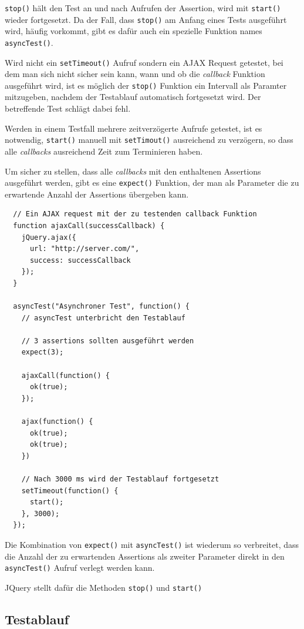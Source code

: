 \documentclass[11pt, a4paper]{article}
\begin{document}
\texttt{stop()} hält den Test an und nach Aufrufen der Assertion, wird
mit \texttt{start()} wieder fortgesetzt. Da der Fall, dass \texttt{stop()} am
Anfang eines Tests ausgeführt wird, häufig vorkommt, gibt es dafür auch ein
spezielle Funktion names \texttt{asyncTest()}.

Wird nicht ein \texttt{setTimeout()} Aufruf sondern ein AJAX Request
getestet, bei dem man sich nicht sicher sein kann, wann und ob die
\emph{callback} Funktion ausgeführt wird, ist es möglich der \texttt{stop()}
Funktion ein Intervall als Paramter mitzugeben, nachdem der Testablauf
automatisch fortgesetzt wird. Der betreffende Test schlägt dabei fehl.

Werden in einem Testfall mehrere zeitverzögerte Aufrufe getestet, ist es
notwendig, \texttt{start()} manuell mit \texttt{setTimout()} ausreichend zu
verzögern, so dass alle \emph{callbacks} ausreichend Zeit zum Terminieren haben.

Um sicher zu stellen, dass alle \emph{callbacks} mit den enthaltenen
Assertions ausgeführt werden, gibt es eine \texttt{expect()} Funktion,
der man als Parameter die zu erwartende Anzahl der Assertions übergeben
kann.

\begin{verbatim}
  // Ein AJAX request mit der zu testenden callback Funktion
  function ajaxCall(successCallback) {
    jQuery.ajax({
      url: "http://server.com/",
      success: successCallback
    });
  }

  asyncTest("Asynchroner Test", function() {
    // asyncTest unterbricht den Testablauf

    // 3 assertions sollten ausgeführt werden
    expect(3);

    ajaxCall(function() {
      ok(true);
    });

    ajax(function() {
      ok(true);
      ok(true);
    })

    // Nach 3000 ms wird der Testablauf fortgesetzt
    setTimeout(function() {
      start();
    }, 3000);
  });
\end{verbatim}

Die Kombination von \texttt{expect()} mit \texttt{asyncTest()} ist wiederum so
verbreitet, dass die Anzahl der zu erwartenden Assertions als zweiter
Parameter direkt in den \texttt{asyncTest()} Aufruf verlegt werden kann.

JQuery stellt dafür die Methoden \texttt{stop()} und \texttt{start()}

\subsection{Testablauf}
\end{document}
